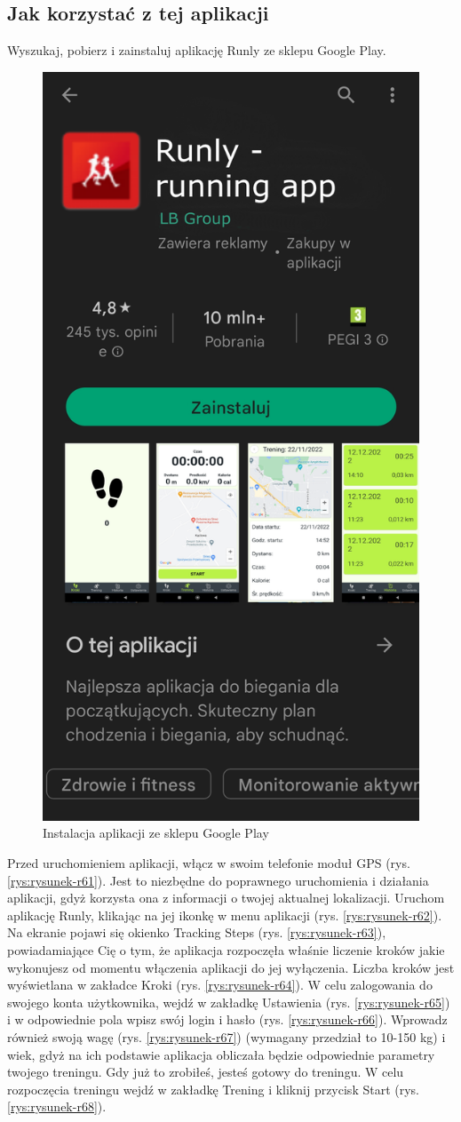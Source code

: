 \subsection{Jak korzystać z tej aplikacji}

Wyszukaj, pobierz i zainstaluj aplikację Runly ze sklepu Google Play.

\begin{figure}[!htb]
	\centering
	\includegraphics[width=.4\linewidth]{rys/runlyPS.png}
	\caption{Instalacja aplikacji ze sklepu Google Play}
	\label{rys:rysunek001epi}
\end{figure}

Przed uruchomieniem aplikacji, włącz w swoim telefonie moduł GPS (rys. \ref{rys:rysunek-r61}). Jest to niezbędne do poprawnego uruchomienia i działania aplikacji, gdyż korzysta ona z informacji o twojej aktualnej lokalizacji.
Uruchom aplikację Runly, klikając na jej ikonkę w menu aplikacji (rys. \ref{rys:rysunek-r62}).
Na ekranie pojawi się okienko Tracking Steps (rys. \ref{rys:rysunek-r63}), powiadamiające Cię o tym, że aplikacja rozpoczęła właśnie liczenie kroków jakie wykonujesz od momentu włączenia aplikacji do jej wyłączenia. Liczba kroków jest wyświetlana w zakładce Kroki (rys. \ref{rys:rysunek-r64}). W celu zalogowania do swojego konta użytkownika, wejdź w zakładkę Ustawienia (rys. \ref{rys:rysunek-r65}) i w odpowiednie pola wpisz swój login i hasło (rys. \ref{rys:rysunek-r66}). Wprowadz również swoją wagę (rys. \ref{rys:rysunek-r67}) (wymagany przedział to 10-150 kg) i wiek, gdyż na ich podstawie aplikacja obliczała będzie odpowiednie parametry twojego treningu. Gdy już to zrobiłeś, jesteś gotowy do treningu.
W celu rozpoczęcia treningu wejdź w zakładkę Trening i kliknij przycisk Start (rys. \ref{rys:rysunek-r68}). \\

